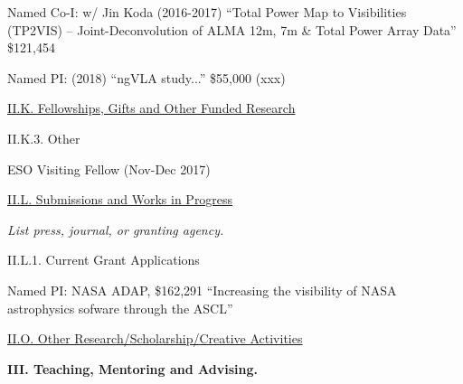 \documentclass[11pt,letterpaper]{article}
\begin{document}
Named Co-I: w/ Jin Koda (2016-2017)
``Total Power Map to Visibilities (TP2VIS) -- Joint-Deconvolution of ALMA 12m, 7m \& Total Power Array Data''
		\$121,454

Named PI: (2018)
``ngVLA study...'' \$55,000 (xxx)




\underline{II.K. Fellowships, Gifts and Other Funded Research}




II.K.3. Other

ESO Visiting Fellow (Nov-Dec 2017)



\underline{II.L. Submissions and Works in Progress}

\textit{List press, journal, or granting agency.}

II.L.1. Current Grant Applications

Named PI: NASA ADAP, \$162,291
``Increasing the visibility of NASA astrophysics sofware through the ASCL''




















\underline{II.O. Other Research/Scholarship/Creative Activities}


\textbf{III. Teaching, Mentoring and Advising.}
\end{document}
